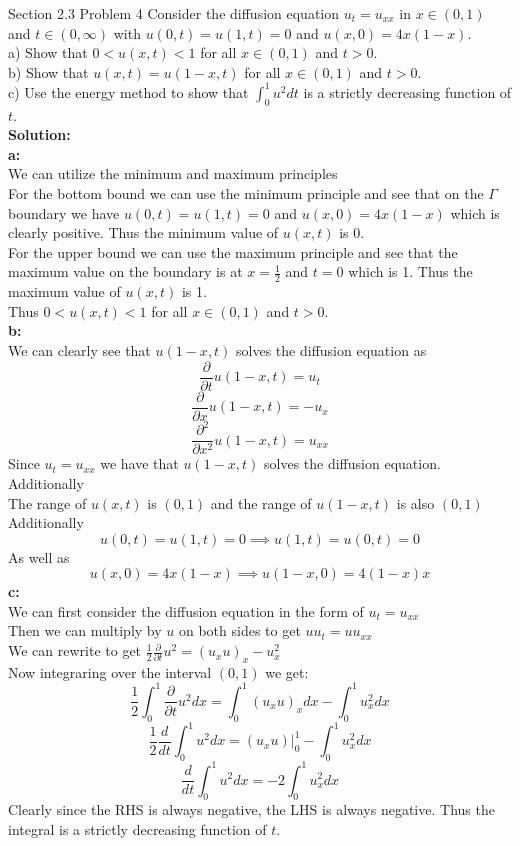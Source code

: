 \documentclass[answers,12pt,addpoints]{exam}
\begin{document}
\begin{questions}
\question Section 2.3 Problem 4
Consider the diffusion equation $u_t = u_{xx}$ in $x \in (0,1)$ and $t \in (0, \infty)$ with $u(0,t) = u(1,t) = 0$ and $u(x,0) = 4x(1-x)$.\\
a) Show that $0 <u(x,t) < 1$ for all $x \in (0,1)$ and $t > 0$.\\
b) Show that $u(x,t) = u(1-x,t)$ for all $x \in (0,1)$ and $t > 0$.\\
c) Use the energy method to show that $\int_0^1 u^2 dt$ is a strictly decreasing function of $t$.\\
\textbf{Solution:}\\
\textbf{a:}\\
We can utilize the minimum and maximum principles\\
For the bottom bound we can use the minimum principle and see that on the $\Gamma$ boundary we have $u(0,t) = u(1,t) = 0$ and $u(x,0) = 4x(1-x)$ which is clearly positive. Thus the minimum value of $u(x,t)$ is 0.\\
For the upper bound we can use the maximum principle and see that the maximum value on the boundary is at $x = \frac{1}{2}$ and $t = 0$ which is 1. Thus the maximum value of $u(x,t)$ is 1.\\
Thus $0 < u(x,t) < 1$ for all $x \in (0,1)$ and $t > 0$.\\
\textbf{b:}\\
We can clearly see that $u(1-x,t)$ solves the diffusion equation as 
$$ \frac{\partial}{\partial t}u(1-x,t) = u_t$$
$$ \frac{\partial}{\partial x} u(1-x,t) = -u_x$$
$$ \frac{\partial^2}{\partial x^2} u(1-x,t) = u_{xx}$$
Since $u_t = u_{xx}$ we have that $u(1-x,t)$ solves the diffusion equation.\\
Additionally \\
The range of $u(x,t)$ is $(0,1)$ and the range of $u(1-x,t)$ is also $(0,1)$\\
Additionally 
$$ u(0,t) = u(1,t) = 0 \implies u(1,t) = u(0,t) = 0$$
As well as 
$$u(x,0) = 4x(1-x) \implies u(1-x,0) = 4(1-x)x $$
\textbf{c:}\\
We can first consider the diffusion equation in the form of $u_t = u_{xx}$\\
Then we can multiply by $u$ on both sides to get $u u_t = u u_{xx}$\\
We can rewrite to get $\frac{1}{2} \frac{\partial}{\partial t} u^2 = (u_x u )_x - u_x^2$\\
Now integraring over the interval $(0,1)$ we get:
$$ \frac{1}{2} \int_0^1 \frac{\partial}{\partial t} u^2 dx = \int_0^1 (u_x u )_x dx - \int_0^1 u_x^2 dx$$
$$ \frac{1}{2} \frac{d}{dt} \int_0^1 u^2 dx = (u_x u )|_0^1 - \int_0^1 u_x^2 dx$$
$$\frac{d}{dt} \int_0^1 u^2 dx = - 2\int_0^1 u_x^2 dx$$
Clearly since the RHS is always negative, the LHS is always negative. Thus the integral is a strictly decreasing function of $t$.


\end{questions}
\end{document}
